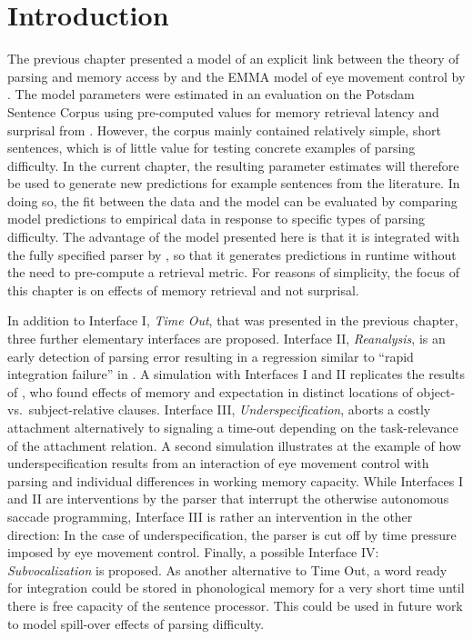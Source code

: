 \documentclass{cambridge7A}\usepackage[]{graphicx}\usepackage[]{color}
\begin{document}
\section{Introduction}



The previous chapter presented a model of an explicit link between the theory of parsing and memory access by \cite{LewisVasishth2005} and the EMMA model of eye movement control by \cite{Salvucci2001}.
The model parameters were estimated in an evaluation on the Potsdam Sentence Corpus \citep{Kliegl2004} using pre-computed values for memory retrieval latency and surprisal from \cite{BostonHaleVasishth2011}. However, the corpus mainly contained relatively simple, short sentences, which is of little value for testing concrete examples of parsing difficulty. In the current chapter, the resulting parameter estimates will therefore be used to generate new predictions for example sentences from the literature. In doing so, the fit between the data and the model can be evaluated by comparing model predictions to empirical data in response to specific types of parsing difficulty. 
The advantage of the model presented here is that it is integrated with the fully specified parser by \cite{LewisVasishth2005}, so that it generates predictions in runtime without the need to pre-compute a retrieval metric. For reasons of simplicity, the focus of this chapter is on effects of memory retrieval and not surprisal.

In addition to Interface I, \emph{Time Out}, that was presented in the previous chapter, three further elementary interfaces are proposed. Interface II,  \emph{Reanalysis}, is an early detection of parsing error resulting in a regression similar to ``rapid integration failure'' in \cite{ReichleWarrenMcConnell2009}.
A simulation with Interfaces I and II replicates the results of \cite{Staub2010a}, who found effects of memory and expectation in distinct locations of object- vs.\ subject-relative clauses. 
Interface III,  \emph{Underspecification}, aborts a costly attachment alternatively to signaling a time-out depending on the task-relevance of the attachment relation.
A second simulation illustrates at the example of \cite{MalsburgVasishth2013} how underspecification results from an interaction of eye movement control with parsing and individual differences in working memory capacity.
While Interfaces I and II are interventions by the parser that interrupt the otherwise autonomous saccade programming, Interface III is rather an intervention in the other direction: In the case of underspecification, the parser is cut off by time pressure imposed by eye movement control.
Finally, a possible Interface IV:  \emph{Subvocalization} is proposed. As another alternative to Time Out, a word ready for integration could be stored in phonological memory \citep{BaddeleyHitch1974,Baddeley2003} for a very short time until there is free capacity of the sentence processor. This could be used in future work to model spill-over effects of parsing difficulty.
\end{document}
